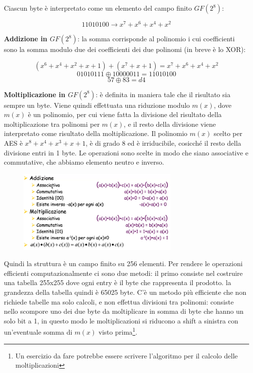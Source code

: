 Ciascun byte è interpretato come un elemento del campo finito $GF(2^{8})$:

\[ 11010100 \rightarrow x^{7} + x^{6} + x^{4} + x^{2} \]

\textbf{Addizione in $GF(2^{8})$}: la somma corrisponde al polinomio i cui coefficienti sono la somma modulo due dei coefficienti dei due polinomi (in breve è lo XOR):

\[(x^{6} + x^{4} + x^{2} + x + 1) + (x^{7} + x + 1) = x^{7} + x^{6} + x^{4} + x^{2}\]
\[01010111 \oplus 10000011 = 11010100\]
\[57 \oplus 83 = d4\]

\textbf{Moltiplicazione in $GF(2^{8})$}: è definita in maniera tale che il risultato sia sempre un byte. Viene quindi effettuata una riduzione modulo $m(x)$, dove $m(x)$ è un polinomio, per cui viene fatta la divisione del risultato della moltiplicazione tra polinomi per $m(x)$, e il resto della divisione viene interpretato come risultato della moltiplicazione. Il polinomio $m(x)$ scelto per AES è $x^{8} + x^{4} + x^{3} + x + 1$, è di grado 8 ed è irriducibile, cosicché il resto della divisione entri in 1 byte. Le operazioni sono scelte in modo che siano associative e commutative, che abbiamo elemento neutro e inverso.

\begin{figure}[htb!]
    \centering
    \includegraphics[width=8cm]{./Images/cap1/1.20.png}
\end{figure} 

Quindi la struttura è un campo finito su 256 elementi. Per rendere le operazioni efficienti computazionalmente ci sono due metodi: il primo consiste nel costruire una tabella 255x255 dove ogni entry è il byte che rappresenta il prodotto. la grandezza della tabella quindi è 65025 byte. C'è un metodo più efficiente che non richiede tabelle ma solo calcoli, e non effettua divisioni tra polinomi: consiste nello scompore uno dei due byte da moltiplicare in somma di byte che hanno un solo bit a 1, in questo modo le moltiplicazioni si riducono a shift a sinistra con un'eventuale somma di $m(x)$ visto prima\footnote{Un esercizio da fare potrebbe essere scrivere l'algoritmo per il calcolo delle moltiplicazioni}. 

